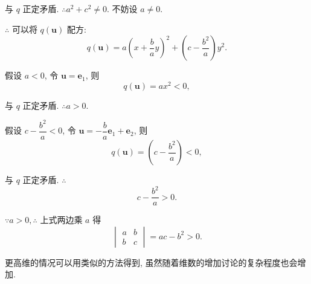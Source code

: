 \documentclass{ctexart}
\begin{document}
与 $q$ 正定矛盾. $\therefore a^2+c^2\neq0$. 不妨设 $a\neq0$.

$\therefore$ 可以将 $q(\boldsymbol{u})$ 配方:
\begin{equation}\label{eq3.2}
    q(\boldsymbol{u})=a\left(x+\dfrac{b}{a}y\right)^2+\left(c-\dfrac{b^2}{a}\right)y^2.
\end{equation}

假设 $a<0$, 令 $\boldsymbol{u}=\boldsymbol{e}_1$, 则
\[q(\boldsymbol{u})=ax^2<0,\]

与 $q$ 正定矛盾. $\therefore a>0$.

假设 $c-\dfrac{b^2}{a}<0$, 令 $\boldsymbol{u}=-\dfrac{b}{a}\boldsymbol{e}_1+\boldsymbol{e}_2$, 则
\[q(\boldsymbol{u})=\left(c-\dfrac{b^2}{a}\right)<0,\]

与 $q$ 正定矛盾. $\therefore$
\[c-\dfrac{b^2}{a}>0.\]

$\because a>0,\therefore$ 上式两边乘 $a$ 得
\[\begin{vmatrix}
    a & b \\
    b & c
\end{vmatrix}=ac-b^2>0.\]

更高维的情况可以用类似的方法得到, 虽然随着维数的增加讨论的复杂程度也会增加.
\end{document}
